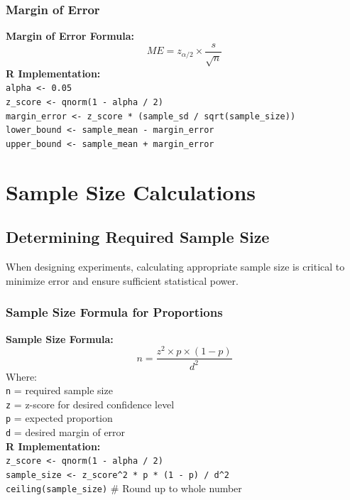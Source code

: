 \documentclass[11pt,a4paper]{article}
\begin{document}
\subsubsection{Margin of Error}

\begin{estimationbox}
\textbf{Margin of Error Formula:}
$$ME = z_{\alpha/2} \times \frac{s}{\sqrt{n}}$$
\textbf{R Implementation:}\\
\texttt{alpha <- 0.05}\\
\texttt{z\_score <- qnorm(1 - alpha / 2)}\\
\texttt{margin\_error <- z\_score * (sample\_sd / sqrt(sample\_size))}\\
\texttt{lower\_bound <- sample\_mean - margin\_error}\\
\texttt{upper\_bound <- sample\_mean + margin\_error}
\end{estimationbox}

\section{Sample Size Calculations}

\subsection{Determining Required Sample Size}

When designing experiments, calculating appropriate sample size is critical to minimize error and ensure sufficient statistical power.

\subsubsection{Sample Size Formula for Proportions}

\begin{formulabox}
\textbf{Sample Size Formula:}
$$n = \frac{z^2 \times p \times (1-p)}{d^2}$$
Where:\\
\texttt{n} = required sample size\\
\texttt{z} = z-score for desired confidence level\\
\texttt{p} = expected proportion\\
\texttt{d} = desired margin of error\\[0.3cm]
\textbf{R Implementation:}\\
\texttt{z\_score <- qnorm(1 - alpha / 2)}\\
\texttt{sample\_size <- z\_score\^{}2 * p * (1 - p) / d\^{}2}\\
\texttt{ceiling(sample\_size)} \# Round up to whole number
\end{formulabox}
\end{document}
